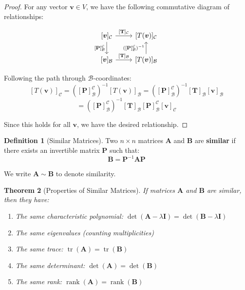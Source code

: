 \documentclass[12pt]{article}
\numberwithin{equation}{section}
\newcommand{\vect}[1]{\boldsymbol{#1}}   %
\newcommand{\mat}[1]{\mathbf{#1}}        %
\newcommand{\rank}{\operatorname{rank}}
\newcommand{\tr}{\operatorname{tr}}
\theoremstyle{plain}
\newtheorem{theorem}{Theorem}[section]
\theoremstyle{definition}
\newtheorem{definition}[theorem]{Definition}
\theoremstyle{remark}
\begin{document}
\begin{proof}
For any vector $\vect{v} \in V$, we have the following commutative diagram of relationships:

\[
\begin{tikzcd}
{[\vect{v}]_{\mathcal{C}}}
  \arrow[r, "{[\mat{T}]_{\mathcal{C}}}"]
  \arrow[d, "{[\mat{P}]_{\mathcal{B}}^{\mathcal{C}}}"']
&
{[T(\vect{v})]_{\mathcal{C}}}
\\
{[\vect{v}]_{\mathcal{B}}}
  \arrow[r, "{[\mat{T}]_{\mathcal{B}}}"]
&
{[T(\vect{v})]_{\mathcal{B}}}
  \arrow[u, "{([\mat{P}]_{\mathcal{B}}^{\mathcal{C}})^{-1}}"]
\end{tikzcd}
\]

Following the path through $\mathcal{B}$-coordinates:
$$[T(\vect{v})]_{\mathcal{C}} = ([\mat{P}]_{\mathcal{B}}^{\mathcal{C}})^{-1} [T(\vect{v})]_{\mathcal{B}} = ([\mat{P}]_{\mathcal{B}}^{\mathcal{C}})^{-1} [\mat{T}]_{\mathcal{B}} [\vect{v}]_{\mathcal{B}}$$
$$= ([\mat{P}]_{\mathcal{B}}^{\mathcal{C}})^{-1} [\mat{T}]_{\mathcal{B}} [\mat{P}]_{\mathcal{B}}^{\mathcal{C}} [\vect{v}]_{\mathcal{C}}$$

Since this holds for all $\vect{v}$, we have the desired relationship.
\end{proof}

\begin{definition}[Similar Matrices]
Two $n \times n$ matrices $\mat{A}$ and $\mat{B}$ are \textbf{similar} if there exists an invertible matrix $\mat{P}$ such that:
$$\mat{B} = \mat{P}^{-1}\mat{A}\mat{P}$$

We write $\mat{A} \sim \mat{B}$ to denote similarity.
\end{definition}

\begin{theorem}[Properties of Similar Matrices]
If matrices $\mat{A}$ and $\mat{B}$ are similar, then they have:
\begin{enumerate}
\item The same characteristic polynomial: $\det(\mat{A} - \lambda\mat{I}) = \det(\mat{B} - \lambda\mat{I})$
\item The same eigenvalues (counting multiplicities)
\item The same trace: $\tr(\mat{A}) = \tr(\mat{B})$
\item The same determinant: $\det(\mat{A}) = \det(\mat{B})$
\item The same rank: $\rank(\mat{A}) = \rank(\mat{B})$
\end{enumerate}
\end{theorem}
\end{document}
